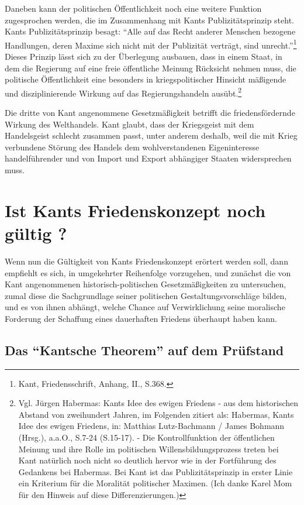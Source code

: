\documentclass[12pt,a4paper,ngerman]{article}
\begin{document}
Daneben kann der politischen Öffentlichkeit noch eine weitere Funktion
zugesprochen werden, die im Zusammenhang mit Kants Publizitätsprinzip
steht. Kants Publizitätsprinzip besagt: "`Alle auf das Recht anderer
Menschen bezogene Handlungen, deren Maxime sich nicht mit der
Publizität verträgt, sind unrecht."'\footnote{Kant, Friedensschrift,
  Anhang, II., S.368.} Dieses Prinzip lässt sich zu der Überlegung
ausbauen, dass in einem Staat, in dem die Regierung auf eine freie
öffentliche Meinung Rücksicht nehmen muss, die politische
Öffentlichkeit eine besonders in kriegspolitischer Hinsicht mäßigende
und disziplinierende Wirkung auf das Regierungshandeln
ausübt.\footnote{Vgl. Jürgen Habermas: Kants Idee des ewigen Friedens
  - aus dem historischen Abstand von zweihundert Jahren, im Folgenden
  zitiert als: Habermas, Kants Idee des ewigen Friedens, in: Matthias
  Lutz-Bachmann / James Bohmann (Hrsg.), a.a.O., S.7-24 (S.15-17). -
  Die Kontrollfunktion der öffentlichen Meinung und ihre Rolle im
  politischen Willensbildungsprozess treten bei Kant natürlich noch
  nicht so deutlich hervor wie in der Fortführung des Gedankens bei
  Habermas. Bei Kant ist das Publizitätsprinzip in erster Linie ein
  Kriterium für die Moralität politischer Maximen. (Ich danke Karel
  Mom für den Hinweis auf diese Differenzierungen.)}

Die dritte von Kant angenommene Gesetzmäßigkeit betrifft die
friedensfördernde Wirkung des Welthandels. Kant glaubt, dass der
Kriegsgeist mit dem Handelsgeist schlecht zusammen passt, unter
anderem deshalb, weil die mit Krieg verbundene Störung des Handels dem
wohlverstandenen Eigeninteresse handelführender und von
Import und Export abhängiger Staaten widersprechen muss.

\section{Ist Kants Friedenskonzept noch gültig ?}

Wenn nun die Gültigkeit von Kants Friedenskonzept erörtert werden
soll, dann empfiehlt es sich, in umgekehrter Reihenfolge vorzugehen,
und zunächst die von Kant angenommenen historisch-politischen
Gesetzmäßigkeiten zu untersuchen, zumal diese die Sachgrundlage seiner
politischen Gestaltungsvorschläge bilden, und es von ihnen abhängt,
welche Chance auf Verwirklichung seine moralische Forderung der Schaffung
eines dauerhaften Friedens überhaupt haben kann.

\subsection{Das "`Kantsche Theorem"' auf dem Prüfstand}
\end{document}
